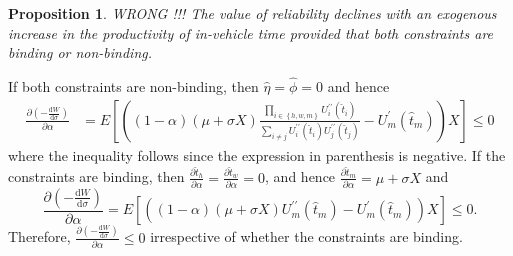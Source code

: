 \documentclass[12pt,a4paper,british]{article}
\makeatletter
\newenvironment{proof}[1][\proofname]{\par
    \normalfont\topsep6\p@\@plus6\p@\relax
    \trivlist
    \itemindent\parindent
    \item[\hskip\labelsep
          \scshape
      #1]\ignorespaces
  }{%
    \endtrivlist\@endpefalse
  }
\providecommand{\proofname}{Proof}
\newtheorem{prop}{Proposition}[section]
\makeatother
\begin{document}


\begin{prop}
	WRONG !!!
The value of reliability declines with an exogenous increase in the productivity of in-vehicle time provided that both constraints are binding or non-binding.
\end{prop}

\begin{proof}
If both constraints are non-binding, then $\hat{\eta}=\hat{\phi}=0$ and hence
\begin{align*}
\frac{\partial\left(-\frac{\mathrm{d}W}{\mathrm{d}\sigma}\right)}{\partial\alpha} &= E\left[\left(\left(1-\alpha\right)\left(\mu+\sigma X\right) \frac{\prod_{i \in \left\{ h,w,m\right\}  }U_{i}^{\prime\prime}\left(\hat{t}_{i}\right)}{\sum_{i\neq j}U_{i}^{\prime\prime}\left(\hat{t}_{i}\right)U_{j}^{\prime\prime}\left(\hat{t}_{j}\right)}-U_{m}^{\prime}\left(\hat{t}_{m}\right)\right)X\right] \leq 0
\end{align*}
where the inequality follows since the expression in parenthesis is negative. If the constraints are binding, then $\frac{\partial\hat{t}_{h}}{\partial\alpha}=\frac{\partial\hat{t}_{w}}{\partial\alpha}=0$, and hence $\frac{\partial\hat{t}_{m}}{\partial\alpha}=\mu+\sigma X$ and
\begin{equation*}
\frac{\partial\left(-\frac{\mathrm{d}W}{\mathrm{d}\sigma}\right)}{\partial\alpha}=E\left[\left(\left(1-\alpha\right)\left(\mu+\sigma X\right)U_{m}^{\prime\prime}\left(\hat{t}_{m}\right)-U_{m}^{\prime}\left(\hat{t}_{m}\right)\right)X\right] \leq 0.
\end{equation*}
Therefore, $\frac{\partial\left(-\frac{\mathrm{d}W}{\mathrm{d}\sigma}\right)}{\partial\alpha} \leq 0 $ irrespective of whether the constraints are binding.
\end{proof}
\end{document}
